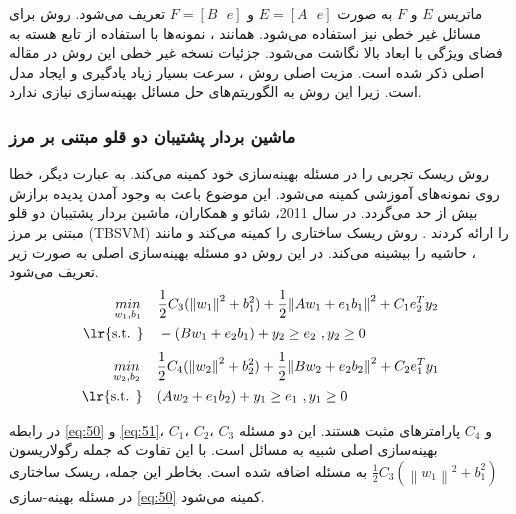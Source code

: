 ماتریس  $E$ و $F$  به صورت  $E=[A\text{ }e]$ و $F=[B\text{ }e]$ تعریف می‌شود.  روش  برای مسائل غیر خطی نیز استفاده می‌شود. همانند ، نمونه‌ها با استفاده از تابع هسته به فضای ویژگی با ابعاد بالا نگاشت می‌شود. جزئیات نسخه غیر خطی این روش در مقاله اصلی \cite{kumar2009} ذکر شده است. مزیت اصلی روش ، سرعت بسیار زیاد یادگیری و ایجاد مدل است. زیرا این روش به الگوریتم‌های حل مسائل بهینه‌سازی نیازی ندارد.

\subsubsection{ماشین بردار پشتیبان دو قلو مبتنی بر مرز}\label{sec:2:2:3:2}
روش  ریسک تجربی را در مسئله بهینه‌سازی خود کمینه می‌کند. به عبارت دیگر، خطا روی نمونه‌های آموزشی کمینه می‌شود. این موضوع باعث به وجود آمدن پدیده برازش بیش از حد می‌گردد. در سال 2011، شائو و همکاران، ماشین بردار پشتیبان دو قلو مبتنی بر مرز (\gls*{TBSVM}) را ارائه کردند \cite{shao2011}. روش  ریسک ساختاری را کمینه می‌کند و مانند ، حاشیه را بیشینه می‌کند. در این روش دو مسئله بهینه‌سازی اصلی به صورت زیر تعریف می‌شود.
\begin{equation}
\begin{split}
   \underset{{{w}_{1}},{{b}_{1}}}{\mathop{min}}\,\quad  & \frac{1 }{2} C_{3} (\left\|w_{1}\right\|^{2}+b^{2}_{1}) + \frac{1}{2}{{\left\| A{{w}_{1}}+{{e}_{1}}{{b}_{1}} \right\|}^{2}}+{{C}_{1}}e_{2}^{T}{{y}_{2}}  \\
\textrm{\lr{s.t. }} \quad  & -(B{{w}_{1}}+{{e}_{2}}{{b}_{1}})+{{y}_{2}}\ge {{e}_{2}}\text{ },{{y}_{2}}\ge 0  \\
\end{split}
\label{eq:50}
\end{equation}
\begin{equation}
\begin{split}
\underset{{{w}_{2}},{{b}_{2}}}{\mathop{min}}\,\quad  & \frac{1 }{2} C_{4} (\left\|w_{2}\right\|^{2}+b^{2}_{2}) + \frac{1}{2}{{\left\| B{{w}_{2}}+{{e}_{2}}{{b}_{2}} \right\|}^{2}}+{{C}_{2}}e_{1}^{T}{{y}_{1}}  \\
\textrm{\lr{s.t. }} \quad  & (A{{w}_{2}}+{{e}_{1}}{{b}_{2}})+{{y}_{1}}\ge {{e}_{1}}\text{ },{{y}_{1}}\ge 0  \\
\end{split}
\label{eq:51}
\end{equation}

در رابطه \ref{eq:50} و \ref{eq:51}،  $C_1$،  $C_2$،  $C_3$ و  $C_4$ پارامترهای مثبت هستند. این دو مسئله بهینه‌سازی اصلی شبیه به مسائل  است. با این تفاوت که جمله رگولاریسون $\frac{1}{2}{{C}_{3}}({{\left\| {{w}_{1}} \right\|}^{2}}+b_{1}^{2})$ به مسئله اضافه شده است. بخاطر این جمله، ریسک ساختاری در مسئله بهینه-سازی \ref{eq:50} کمینه می‌شود.


